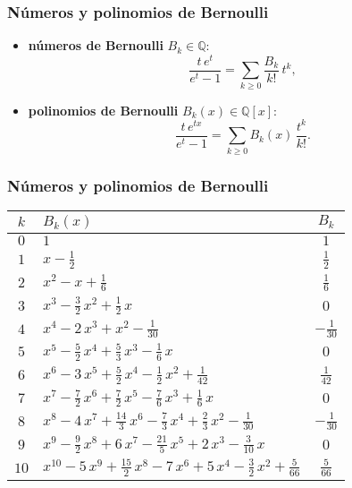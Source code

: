 \documentclass{beamer}
\newcommand{\QQ}{\mathbb{Q}}
\begin{document}
\begin{frame}
  \frametitle{Números y polinomios de Bernoulli}

  \begin{itemize}
  \item<1-> \textbf{números de Bernoulli} $B_k \in \QQ$:
  $$\frac{t\,e^t}{e^t - 1} = \sum_{k\ge 0} \frac{B_k}{k!}\,t^k,$$

  \item<2-> \textbf{polinomios de Bernoulli} $B_k (x) \in \QQ [x]$:
    $$\frac{t\,e^{tx}}{e^t-1} = \sum_{k \ge 0} B_k (x)\,\frac{t^k}{k!}.$$
  \end{itemize}
\end{frame}


\begin{frame}
  \frametitle{Números y polinomios de Bernoulli}

  \begin{center}\small
    \renewcommand{\arraystretch}{1.5}
    \begin{tabular}{clc}
      \hline
      $k$ & $B_k (x)$ & $B_k$ \\
      \hline
      $0$ & $1$ & $1$ \\
      \hline
      $1$ & $x - \frac{1}{2}$ & $\frac{1}{2}$ \\
      \hline
      $2$ & $x^2 - x + \frac{1}{6}$ & $\frac{1}{6}$ \\
      \hline
      $3$ & $x^3 - \frac{3}{2}\,x^2 + \frac{1}{2}\,x$ & $0$ \\
      \hline
      $4$ & $x^4 - 2\,x^3 + x^2 - \frac{1}{30}$ & $-\frac{1}{30}$ \\
      \hline
      $5$ & $x^5 - \frac{5}{2}\,x^4 + \frac{5}{3}\,x^3 - \frac{1}{6}\,x$ & $0$ \\
      \hline
      $6$ & $x^6 - 3\,x^5 + \frac{5}{2}\,x^4 - \frac{1}{2}\,x^2 + \frac{1}{42}$ & $\frac{1}{42}$ \\
      \hline
      $7$ & $x^7 - \frac{7}{2}\,x^6 + \frac{7}{2}\,x^5 - \frac{7}{6}\,x^3 + \frac{1}{6}\,x$ & $0$ \\
      \hline
      $8$ & $x^8 - 4\,x^7 + \frac{14}{3}\,x^6 - \frac{7}{3}\,x^4 + \frac{2}{3}\,x^2 - \frac{1}{30}$ & $-\frac{1}{30}$ \\
      \hline
      $9$ & $x^9 - \frac{9}{2}\,x^8 + 6\,x^7 - \frac{21}{5}\,x^5 + 2\,x^3 - \frac{3}{10}\,x$ & $0$ \\
      \hline
      $10$ & $x^{10} - 5\,x^9 + \frac{15}{2}\,x^8 - 7\,x^6 + 5\,x^4 - \frac{3}{2}\,x^2 + \frac{5}{66}$ & $\frac{5}{66}$ \\
      \hline
    \end{tabular}
  \end{center}
\end{frame}
\end{document}
